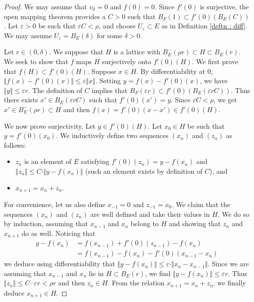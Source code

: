 \documentclass{lms}
\begin{document}
\begin{proof}
We may assume that $v_0=0$ and $f(0)=0$. Since $f'(0)$ is surjective, the open mapping theorem provides a $C>0$ such that 
$B_F(1) \subset f'(0)(B_E(C))$.
Let $\varepsilon>0$ be such that 
$\varepsilon C < \rho$, and choose $U_\varepsilon \subset E$ as in Definition 
\ref{deftn : diff}.  We may assume $U_\varepsilon = B_E(\delta)$ for some $\delta >0$.

Let $r \in (0, \delta)$. We suppose that $H$ is a lattice with 
$B^-_E(\rho r) \subset H \subset B^{\phantom -}_E(r).$
We seek to show that $f$ maps $H$ surjectively onto $f'(0) (H)$. We first prove 
that $f(H) \subset f'(0) (H)$. Suppose $x \in H$. By differentiability at 
$0$, $\Vert f(x)-f'(0)(x) \Vert \leq \varepsilon \Vert x \Vert $. 
Setting $y=f(x)-f'(0)(x)$, we have $\Vert y \Vert \leq 
\varepsilon r$. The definition of $C$ implies that $B_F(\varepsilon r) 
\subset f'(0) (B_E(\varepsilon rC))$. Thus there exists $x' 
\in B_E(\varepsilon r C)$ such that $f'(0) (x') =y$. Since 
$\varepsilon C < \rho$, we get $x' \in B^-_E(\rho r) \subset H$ and 
then $f(x)= f'(0) (x-x') \in f'(0) (H)$.

We now prove surjectivity. Let $y \in f'(0) (H)$. Let $x_0 \in H$ 
be such that $y = f'(0) (x_0)$. We inductively define two sequences 
$(x_n)$ and $(z_n)$ as follows:
\begin{itemize}
\item $z_n$ is an element of $E$ satisfying $f'(0)(z_n) = y - 
f(x_n)$ and $\Vert z_n \Vert \leq C \cdot \Vert y - f(x_n) \Vert$ (such 
an element exists by definition of $C$), and
\item $x_{n+1}=x_n+z_n$.
\end{itemize}
For convenience, let us also define $x_{-1} = 0$ and $z_{-1}=x_0.$ We claim that the 
sequences $(x_n)$ and $(z_n)$ are well defined and take their values in 
$H$. We do so by induction, assuming that $x_{n-1}$ and $x_n$ belong to $H$
and showing that $z_n$ and $x_{n+1}$ do as well. Noticing
that 
\begin{equation}
\label{eq:mainlemma}
\begin{aligned}
y - f(x_n) &= f(x_{n-1}) + f'(0)(z_{n-1}) - f(x_n) \\
&= f(x_{n-1}) - f(x_n) - f'(0)(x_{n-1} - x_n)
\end{aligned}
\end{equation}
we deduce using differentiability that
$\Vert y - f(x_n) \Vert \leq \varepsilon \cdot \Vert x_n - x_{n-1}
\Vert$.
Since we are assuming that $x_{n-1}$ and $x_n$ lie in $H \subset
B_E(r)$, we find $\Vert y - f(x_n) \Vert \leq \varepsilon r$. Thus
$\Vert z_n \Vert \leq C \cdot \varepsilon r < \rho r$ and then
$z_n \in H$. From the relation $x_{n+1} = x_n + z_n$, we finally
deduce $x_{n+1} \in H$.


\end{proof}
\end{document}
